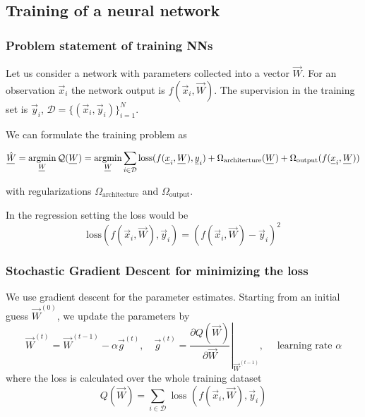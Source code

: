 \subsection{Training of a neural network}

\subsubsection{Problem statement of training NNs}
Let us consider a network with parameters collected into a vector $\vec{W}$.
For an observation $\vec{x}_i$ the network output is $f(\vec{x}_i, \vec{W})$.
The supervision in the training set is $\vec{y}_i$, $\mathcal{D} = \{ (\vec{x}_i, \vec{y}_i) \}_{i=1}^{N}$.

We can formulate the training problem as

\begin{equation}
    \vec{\hat{W}} = \argmin_{\vec{W}} \mathcal{Q}(\vec{W}) = \argmin_{\vec{W}} \sum_{i\in \mathcal{D}} \text{loss}(f(\vec{x}_i, \vec{W}), \vec{y}_i) + \Omega_\text{architecture}(\vec{W}) + \Omega_\text{output}(f(\vec{x}_i, \vec{W}))
\end{equation}

with regularizations $\Omega_\text{architecture}$ and $\Omega_\text{output}$.

In the regression setting the loss would be
\begin{equation}
    \text{loss}(f(\vec{x}_i, \vec{W}), \vec{y}_i) = \left( f(\vec{x}_i, \vec{W}) - \vec{y}_i \right)^2
\end{equation}

\subsubsection{Stochastic Gradient Descent for minimizing the loss}
We use gradient descent for the parameter estimates.
Starting from an initial guess $\vec{W}^{(0)}$, we update the parameters by
\begin{equation}
    \vec{W}^{(t)}=\vec{W}^{(t-1)}-\alpha \vec{g}^{(t)}, \quad \vec{g}^{(t)}=\left.\frac{\partial Q(\vec{W})}{\partial \vec{W}}\right|_{\vec{W}^{(t-1)}}, \quad \text { learning rate } \alpha
\end{equation}
where the loss is calculated over the whole training dataset
\begin{equation}
    Q(\vec{W})=\sum_{i \in \mathcal{D}} \text { loss }\left(f\left(\vec{x}_{i}, \vec{W}\right), \vec{y}_{i}\right)
\end{equation}

